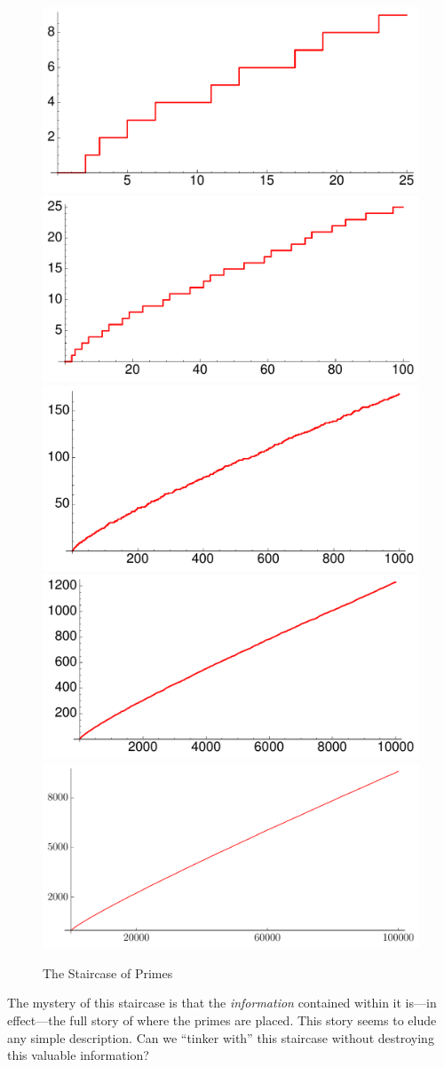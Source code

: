 \documentclass[11pt]{article}
\theoremstyle{plain}
\theoremstyle{definition}
\numberwithin{equation}{section}
\numberwithin{figure}{section}
\numberwithin{table}{section}
\begin{document}
\begin{figure}[H]
\begin{center}
\includegraphics[width=.4\textwidth]{illustrations/PN_25} 
\includegraphics[width=.4\textwidth]{illustrations/PN_100}\\ 

\includegraphics[width=.4\textwidth]{illustrations/PN_1000}
\includegraphics[width=.4\textwidth]{illustrations/PN_10000}\\ 

\includegraphics[width=.6\textwidth]{illustrations/PN_100000}
\end{center}
\caption{The Staircase of Primes\label{fig:staircases}}
\end{figure}

The mystery of this staircase is that the {\em information} contained
within it is---in effect---the full story of where the primes are
placed. This story seems to elude any simple description.  Can we
``tinker with'' this staircase without destroying this valuable
information?
 
\end{document}
